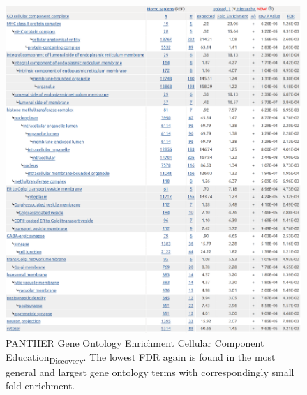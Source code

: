             \begin{figure}
                \centering
                \includegraphics[width=\textwidth]{images/chapter2/large_screenshots/edu_discovery_large_cc_panther.png}
                \caption{PANTHER Gene Ontology Enrichment Cellular Component Education\textsubscript{Discovery}. The lowest FDR again is found in the most general and largest gene ontology terms with correspondingly small fold enrichment. }
                \label{fig:panther cc ukbb edu }
            \end{figure}
            
